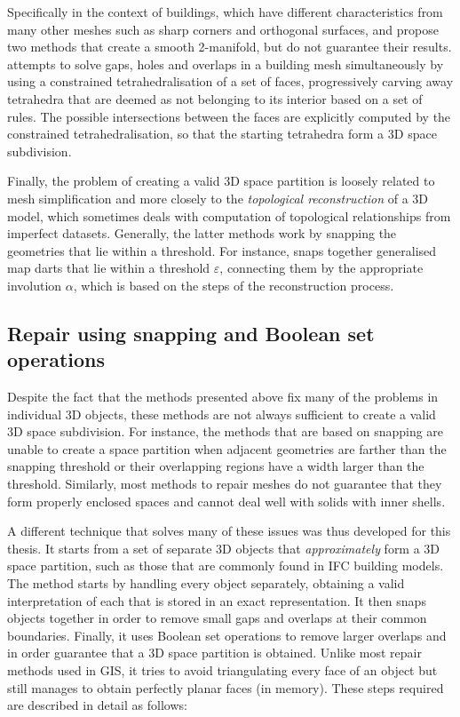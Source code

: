 Specifically in the context of buildings, which have different characteristics from many other meshes such as sharp corners and orthogonal surfaces, \citet{Bogdahn10} and \citet{Alam13} propose two methods that create a smooth 2-manifold, but do not guarantee their results.
\citet{Zhao14} attempts to solve gaps, holes and overlaps in a building mesh simultaneously by using a constrained tetrahedralisation \citep{Si05} of a set of faces, progressively carving away tetrahedra that are deemed as not belonging to its interior based on a set of rules.
The possible intersections between the faces are explicitly computed by the constrained tetrahedralisation, so that the starting tetrahedra form a 3D space subdivision.

Finally, the problem of creating a valid 3D space partition is loosely related to mesh simplification and more closely to the \emph{topological reconstruction} of a 3D model, which sometimes deals with computation of topological relationships from imperfect datasets.
Generally, the latter methods work by snapping the geometries that lie within a threshold.
For instance, \citet{Horna06} snaps together generalised map darts that lie within a threshold $\varepsilon$, connecting them by the appropriate involution $\alpha$, which is based on the steps of the reconstruction process.

\subsection{Repair using snapping and Boolean set operations}

Despite the fact that the methods presented above fix many of the problems in individual 3D objects, these methods are not always sufficient to create a valid 3D space subdivision.
For instance, the methods that are based on snapping are unable to create a space partition when adjacent geometries are farther than the snapping threshold or their overlapping regions have a width larger than the threshold.
Similarly, most methods to repair meshes do not guarantee that they form properly enclosed spaces and cannot deal well with solids with inner shells.

A different technique that solves many of these issues was thus developed for this thesis.
It starts from a set of separate 3D objects that \emph{approximately} form a 3D space partition, such as those that are commonly found in IFC building models.
The method starts by handling every object separately, obtaining a valid interpretation of each that is stored in an exact representation.
It then snaps objects together in order to remove small gaps and overlaps at their common boundaries.
Finally, it uses Boolean set operations to remove larger overlaps and in order guarantee that a 3D space partition is obtained.
Unlike most repair methods used in GIS, it tries to avoid triangulating every face of an object but still manages to obtain perfectly planar faces (in memory).
These steps required are described in detail as follows:

